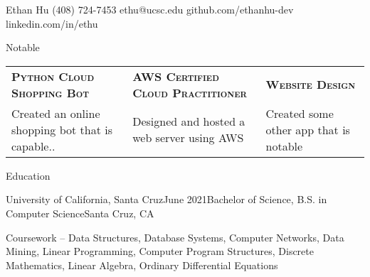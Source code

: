 \documentclass[]{cv_template}
\begin{document}

\begin{cv}

\begin{cvheader}
{Ethan Hu}
{(408) 724-7453}
{ethu@ucsc.edu}
{github.com/ethanhu-dev}
{}
{linkedin.com/in/ethu}
\end{cvheader}


\begin{cvsection}{Notable}

\item[]\begin{tabu}to\textwidth{X[l]X[l]X[l]}%
{\bf\scshape Python Cloud Shopping Bot}&{\bf\scshape AWS Certified Cloud Practitioner}&{\bf\scshape Website Design}\\
Created an online shopping bot that is capable.. & Designed and hosted a web server using AWS  & Created some other app that is notable%
\end{tabu}

\end{cvsection}


\begin{cvsection}{Education}


\begin{cvsubsection}
{University of California, Santa Cruz}{June 2021}{Bachelor of Science, B.S. in Computer Science}{Santa Cruz, CA}

\listitem[] Coursework -- Data Structures, Database Systems, Computer Networks, Data Mining, Linear Programming, Computer Program Structures, Discrete Mathematics, Linear Algebra, Ordinary Differential Equations

\end{cvsubsection}

\end{cvsection}



\end{cv}
\end{document}
